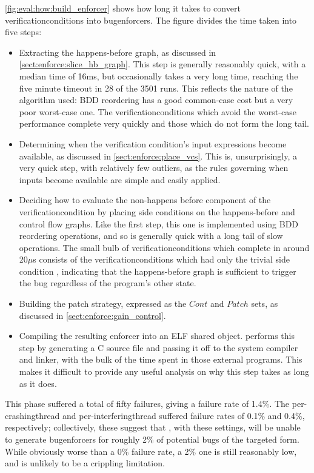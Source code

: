 \noindent
\autoref{fig:eval:how:build_enforcer} shows how long it takes to
convert \glspl{verificationcondition} into \glspl{bugenforcer}.  The
figure divides the time taken into five steps:
\begin{itemize}
\item Extracting the happens-before graph, as discussed in
  \autoref{sect:enforce:slice_hb_graph}.  This step is generally
  reasonably quick, with a median time of 16ms, but occasionally takes
  a very long time, reaching the five minute timeout in 28 of the 3501
  runs.  This reflects the nature of the algorithm used: BDD
  reordering has a good common-case cost but a very poor worst-case
  one.  The \glspl{verificationcondition} which avoid the worst-case
  performance complete very quickly and those which do not form the
  long tail.
\item Determining when the verification condition's input expressions
  become available, as discussed in \autoref{sect:enforce:place_vcs}.
  This is, unsurprisingly, a very quick step, with relatively few
  outliers, as the rules governing when inputs become available are
  simple and easily applied.
\item Deciding how to evaluate the non-happens before component of the
  \gls{verificationcondition} by placing side conditions on the
  happens-before and control flow graphs.  Like the first step, this
  one is implemented using BDD reordering operations, and so is
  generally quick with a long tail of slow operations.  The small bulb
  of \glspl{verificationcondition} which complete in around 20$\mu$s
  consists of the \glspl{verificationcondition} which had only the
  trivial side condition \true, indicating that the happens-before
  graph is sufficient to trigger the bug regardless of the program's
  other state.
\item Building the patch strategy, expressed as the $\mathit{Cont}$
  and $\mathit{Patch}$ sets, as discussed in
  \autoref{sect:enforce:gain_control}.  
\item Compiling the resulting enforcer into an ELF shared object.
  {\Implementation} performs this step by generating a C source file
  and passing it off to the system compiler and linker, with the bulk
  of the time spent in those external programs.  This makes it
  difficult to provide any useful analysis on why this step takes as
  long as it does.
\end{itemize}

This phase suffered a total of fifty failures, giving a failure rate
of 1.4\%.  The per-\gls{crashingthread} and
per-\gls{interferingthread} suffered failure rates of 0.1\% and 0.4\%,
respectively; collectively, these suggest that {\technique}, with
these settings, will be unable to generate \glspl{bugenforcer} for
roughly 2\% of potential bugs of the targeted form.  While obviously
worse than a 0\% failure rate, a 2\% one is still reasonably low, and
is unlikely to be a crippling limitation.

